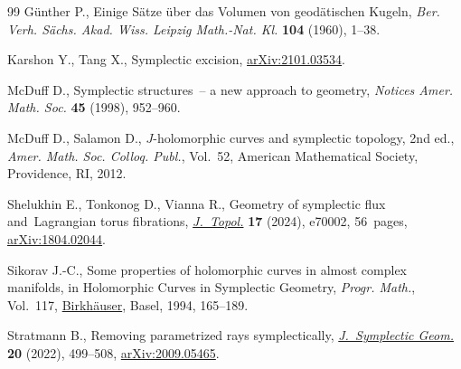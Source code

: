 \begin{thebibliography}{99}
G{\"u}nther P., Einige S{\"a}tze {\"u}ber das {V}olumen von geod{\"a}tischen
 {K}ugeln, \textit{Ber. Verh. S{\"a}chs. Akad. Wiss. Leipzig Math.-Nat. Kl.}
 \textbf{104} (1960), 1--38.

Karshon Y., Tang X., Symplectic excision,
 \href{http://arxiv.org/abs/2101.03534}{arXiv:2101.03534}.

McDuff D., Symplectic structures~-- a new approach to geometry, \textit{Notices
 Amer. Math. Soc.} \textbf{45} (1998), 952--960.

McDuff D., Salamon D., {$J$}-holomorphic curves and symplectic topology, 2nd ed.,
 \textit{Amer. Math. Soc. Colloq. Publ.}, Vol.~52, American
 Mathematical Society, Providence, RI, 2012.

Shelukhin E., Tonkonog D., Vianna R., Geometry of symplectic flux
 and~{L}agrangian torus fibrations,
 \href{https://doi.org/10.1112/topo.70002}{\textit{J.~Topol.}} \textbf{17}
 (2024), e70002, 56~pages,
 \href{http://arxiv.org/abs/1804.02044}{arXiv:1804.02044}.

Sikorav J.-C., Some properties of holomorphic curves in almost complex
 manifolds, in Holomorphic {C}urves in {S}ymplectic {G}eometry, \textit{Progr.
 Math.}, Vol.~117,
 \href{https://doi.org/10.1007/978-3-0348-8508-9_6}{Birkh\"auser}, Basel,
 1994, 165--189.

Stratmann B., Removing parametrized rays symplectically,
 \href{https://doi.org/10.4310/jsg.2022.v20.n2.a4}{\textit{J.~Symplectic
 Geom.}} \textbf{20} (2022), 499--508,
 \href{http://arxiv.org/abs/2009.05465}{arXiv:2009.05465}.

\end{thebibliography}
